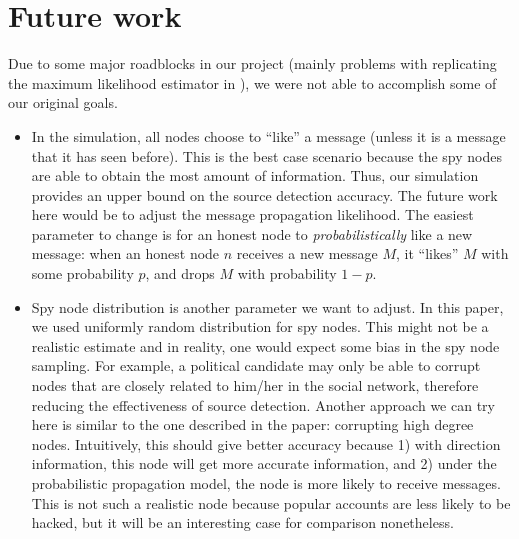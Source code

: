 \section{Future work}

Due to some major roadblocks in our project (mainly problems with replicating the maximum likelihood estimator in \cite{pinto}), we were not able to accomplish some of our original goals. 

\begin{itemize}

\item In the simulation, all nodes choose to ``like'' a message (unless it is a message that it has seen before). This is the best case scenario because the spy nodes are able to obtain the most amount of information. Thus, our simulation provides an upper bound on the source detection accuracy. The future work here would be to adjust the message propagation likelihood. The easiest parameter to change is for an honest node to \emph{probabilistically} like a new message: when an honest node $n$ receives a new message $M$, it ``likes'' $M$ with some probability $p$, and drops $M$ with probability $1-p$.

\item Spy node distribution is another parameter we want to adjust. In this paper, we used uniformly random distribution for spy nodes. This might not be a realistic estimate and in reality, one would expect some bias in the spy node sampling. For example, a political candidate may only be able to corrupt nodes that are closely related to him/her in the social network, therefore reducing the effectiveness of source detection. Another approach we can try here is similar to the one described in the paper: corrupting high degree nodes. Intuitively, this should give better accuracy because 1) with direction information, this node will get more accurate information, and 2) under the probabilistic propagation model, the node is more likely to receive messages. This is not such a realistic node because popular accounts are less likely to be hacked, but it will be an interesting case for comparison nonetheless.

\end{itemize}
